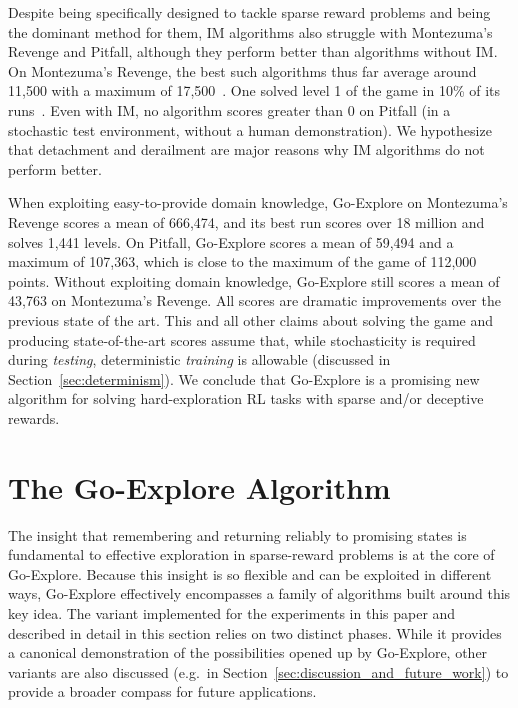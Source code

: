 \documentclass{article}
\begin{document}
Despite being specifically designed to tackle sparse reward problems and being the dominant method for them, IM algorithms also struggle with Montezuma's Revenge and Pitfall, although they perform better than algorithms without IM. On Montezuma's Revenge, the best such algorithms thus far average around 11,500 with a maximum of 17,500~\cite{burda:rnd2018,Choi2018ContingencyAwareEI}. One solved level 1 of the game in 10\% of its runs~\cite{burda:rnd2018}. Even with IM, no algorithm scores greater than 0 on Pitfall (in a stochastic test environment, without a human demonstration). 
We hypothesize that detachment and derailment are major reasons why IM algorithms do not perform better.

When exploiting easy-to-provide domain knowledge, Go-Explore on Montezuma's Revenge scores a mean of 666,474, and its best run scores over 18 million and solves 1,441 levels. On Pitfall, Go-Explore scores a mean of 59,494 and a maximum of 107,363, which is close to the maximum of the game of 112,000 points. Without exploiting domain knowledge, Go-Explore still scores a mean of 43,763 on Montezuma's Revenge. All scores are dramatic improvements over the previous state of the art.
This and all other claims about solving the game and producing state-of-the-art scores assume that, while stochasticity is required during \emph{testing}, deterministic \emph{training} is allowable (discussed in Section~\ref{sec:determinism}).
We conclude that Go-Explore is a promising new algorithm for solving hard-exploration RL tasks with sparse and/or deceptive rewards.



\section{The Go-Explore Algorithm}

The insight that remembering and returning reliably to promising states is fundamental to effective exploration in sparse-reward problems is at the core of Go-Explore. Because this insight is so flexible and can be exploited in different ways, Go-Explore effectively encompasses a family of algorithms built around this key idea.  The variant implemented for the experiments in this paper and described in detail in this section relies on two distinct phases. While it provides a canonical demonstration of the possibilities opened up by Go-Explore, other variants are also discussed (e.g.\ in Section~\ref{sec:discussion_and_future_work}) to provide a broader compass for future applications. 
\end{document}
